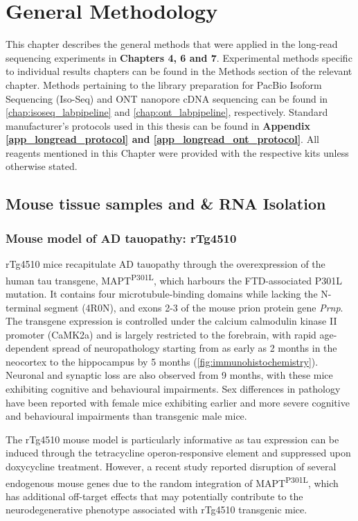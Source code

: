 \chapter{General Methodology}\label{ch: general methodology}

This chapter describes the general methods that were applied in the long-read sequencing experiments in \textbf{Chapters 4, 6 and 7}. Experimental methods specific to individual results chapters can be found in the Methods section of the relevant chapter. Methods pertaining to the library preparation for PacBio Isoform Sequencing (Iso-Seq) and ONT nanopore cDNA sequencing can be found in \cref{chap:isoseq_labpipeline} and \cref{chap:ont_labpipeline}, respectively. Standard manufacturer's protocols used in this thesis can be found in \textbf{Appendix \ref{app_longread_protocol} and \ref{app_longread_ont_protocol}}. All reagents mentioned in this Chapter were provided with the respective kits unless otherwise stated.

\section{Mouse tissue samples and \& RNA Isolation}

\subsection{Mouse model of AD tauopathy: rTg4510} 
\label{ch2: rtg4510}
rTg4510 mice recapitulate AD tauopathy through the overexpression of the human tau transgene, MAPT\textsuperscript{P301L}, which harbours the FTD-associated P301L mutation. It contains four microtubule-binding domains while lacking the N-terminal segment (4R0N), and exons 2-3 of the mouse prion protein gene \textit{Prnp}. The transgene expression is controlled under the calcium calmodulin kinase II promoter (CaMK2a) and is largely restricted to the forebrain, with rapid age-dependent spread of neuropathology starting from as early as 2 months in the neocortex to the hippocampus by 5 months (\cref{fig:immunohistochemistry}). Neuronal and synaptic loss are also observed from 9 months, with these mice exhibiting cognitive and behavioural impairments. Sex differences in pathology have been reported with female mice exhibiting earlier and more severe cognitive and behavioural impairments than transgenic male mice\cite{M2011}. 

The rTg4510 mouse model is particularly informative as tau expression can be induced through the tetracycline operon-responsive element and suppressed upon doxycycline treatment\cite{Ramsden2005}. However, a recent study reported disruption of several endogenous mouse genes due to the random integration of MAPT\textsuperscript{P301L}, which has additional off-target effects that may potentially contribute to the neurodegenerative phenotype associated with rTg4510 transgenic mice\cite{Gamache2019}. 
 

